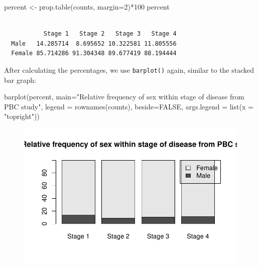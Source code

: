 \documentclass[
  a4paper,
]{memoir}
\newenvironment{Shaded}{\begin{snugshade}}{\end{snugshade}}
\newcommand{\AttributeTok}[1]{\textcolor[rgb]{0.00,0.00,0.00}{#1}}
\newcommand{\ConstantTok}[1]{\textcolor[rgb]{0.00,0.00,0.00}{#1}}
\newcommand{\DecValTok}[1]{\textcolor[rgb]{0.00,0.00,0.00}{#1}}
\newcommand{\FunctionTok}[1]{\textcolor[rgb]{0.00,0.00,0.00}{#1}}
\newcommand{\NormalTok}[1]{\textcolor[rgb]{0.00,0.00,0.00}{#1}}
\newcommand{\OtherTok}[1]{\textcolor[rgb]{0.00,0.00,0.00}{#1}}
\newcommand{\SpecialCharTok}[1]{\textcolor[rgb]{0.00,0.00,0.00}{#1}}
\newcommand{\StringTok}[1]{\textcolor[rgb]{0.00,0.00,0.00}{#1}}
\begin{document}
\begin{Shaded}
\begin{Highlighting}[]
\NormalTok{percent }\OtherTok{\textless{}{-}} \FunctionTok{prop.table}\NormalTok{(counts, }\AttributeTok{margin=}\DecValTok{2}\NormalTok{)}\SpecialCharTok{*}\DecValTok{100}
\NormalTok{percent}
\end{Highlighting}
\end{Shaded}

\begin{verbatim}
        
           Stage 1   Stage 2   Stage 3   Stage 4
  Male   14.285714  8.695652 10.322581 11.805556
  Female 85.714286 91.304348 89.677419 88.194444
\end{verbatim}

After calculating the percentages, we use \texttt{barplot()} again,
similar to the stacked bar graph:

\begin{Shaded}
\begin{Highlighting}[]
\FunctionTok{barplot}\NormalTok{(percent, }
        \AttributeTok{main=}\StringTok{"Relative frequency of sex within stage of disease from PBC study"}\NormalTok{,}
        \AttributeTok{legend =} \FunctionTok{rownames}\NormalTok{(counts), }\AttributeTok{beside=}\ConstantTok{FALSE}\NormalTok{, }\AttributeTok{args.legend =} \FunctionTok{list}\NormalTok{(}\AttributeTok{x =} \StringTok{"topright"}\NormalTok{))}
\end{Highlighting}
\end{Shaded}

\begin{figure}[H]

{\centering \includegraphics{01-intro_files/figure-pdf/unnamed-chunk-106-1.pdf}

}

\end{figure}
\end{document}
